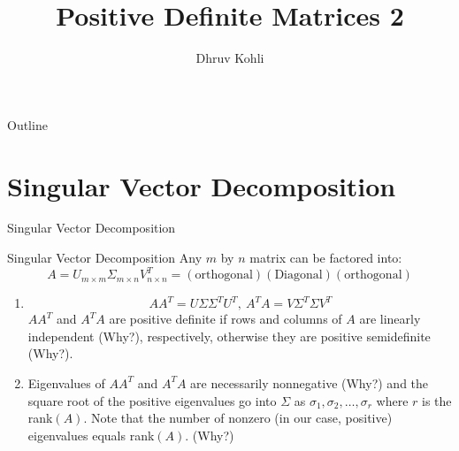 \documentclass{beamer}
\title{Positive Definite Matrices 2}
\author{Dhruv Kohli}
\institute[Indian Institute of Technology, Guwahati] %
{
  Department of Mathematics\\
  Indian Institute of Technology, Guwahati
}
\date{}
\begin{document}
\setlength{\abovedisplayskip}{1pt}
\setlength{\belowdisplayskip}{1pt}

\begin{frame}
  \titlepage
\end{frame}

\begin{frame}{Outline}
  \tableofcontents
\end{frame}

    

\section{Singular Vector Decomposition}

\begin{frame}{Singular Vector Decomposition}{}
\begin{exampleblock}{Singular Vector Decomposition}
Any $m$ by $n$ matrix can be factored into:
\begin{equation*}
    A = U_{m \times m}\Sigma_{m \times n} V_{n \times n}^T = (\text{orthogonal})(\text{Diagonal})(\text{orthogonal})
\end{equation*}
\end{exampleblock}
\begin{enumerate}
    \item {
        \begin{equation*}
            AA^T = U\Sigma\Sigma^TU^T, \ A^TA = V\Sigma^T\Sigma V^T
        \end{equation*}
        $AA^T$ and $A^TA$ are positive definite if rows and columns of $A$ are linearly independent (Why?), respectively, otherwise they are positive semidefinite (Why?).
    }
    \item {
        Eigenvalues of $AA^T$ and $A^TA$ are necessarily nonnegative (Why?) and the square root of the positive eigenvalues go into $\Sigma$ as $\sigma_1, \sigma_2, \ldots, \sigma_r$ where $r$ is the rank$(A)$. Note that the number of nonzero (in our case, positive) eigenvalues equals rank$(A)$. (Why?)
    }
\end{enumerate}
\end{frame}
\end{document}
